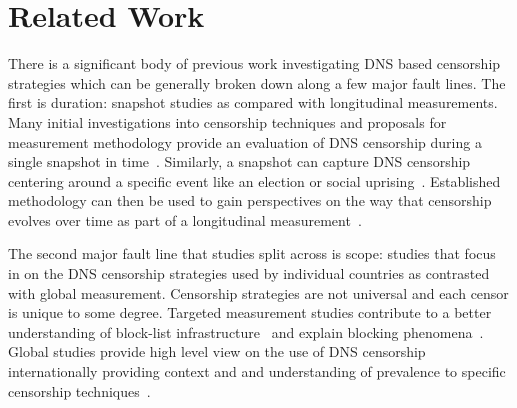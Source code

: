\section{Related Work}\label{sec:related_work}

There is a significant body of previous work investigating DNS based censorship
strategies which can be generally broken down along a few major
fault lines. The first is duration: snapshot studies as compared with longitudinal
measurements. Many initial investigations into censorship techniques and proposals
for measurement methodology provide an evaluation of DNS censorship during a
single snapshot in time~\cite{Anonymous2020:TripletCensors,global2002great,vandersloot2018quack,scott2016satellite,pearce2017global}. Similarly, a snapshot
can capture DNS censorship centering around a specific event like an election or
social uprising~\cite{aryan2013internet}. Established methodology can then be used to
gain perspectives on the way that censorship evolves over time as part of  a
longitudinal measurement~\cite{USESEC21:GFWatch,filasto2012ooni,sundara2020censored,niaki2020iclab}.

The second major fault line that studies split across is scope: studies that focus
in on the DNS censorship strategies used by individual countries as contrasted with global
measurement. Censorship strategies are not universal and each censor is unique
to some degree. Targeted measurement studies contribute to a better
understanding of block-list infrastructure~\cite{ramesh2020decentralized,USESEC21:GFWatch}
and explain blocking phenomena~\cite{global2002great,Anonymous2020:TripletCensors}.
Global studies provide high level view on the use of DNS censorship internationally
providing context and and understanding of prevalence to specific censorship
techniques~\cite{vandersloot2018quack,scott2016satellite,pearce2017global,sundara2020censored,niaki2020iclab}.







